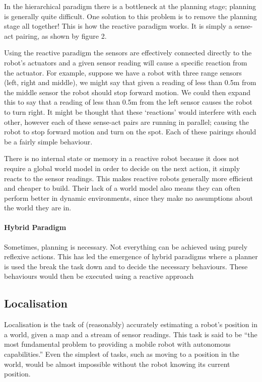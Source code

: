 In the hierarchical paradigm there is a bottleneck at the planning stage; planning is generally quite difficult. One solution to this problem is to remove the planning stage all together! This is how the reactive paradigm works. It is simply a sense-act pairing, as shown by figure 2.

Using the reactive paradigm the sensors are effectively connected directly to the robot’s actuators and a given sensor reading will cause a specific reaction from the actuator. For example, suppose we have a robot with three range sensors (left, right and middle), we might say that given a reading of less than 0.5m from the middle sensor the robot should stop forward motion. We could then expand this to say that a reading of less than 0.5m from the left sensor causes the robot to turn right. It might be thought that these ‘reactions’ would interfere with each other, however each of these sense-act pairs are running in parallel; causing the robot to stop forward motion and turn on the spot. Each of these pairings should be a fairly simple behaviour. 

There is no internal state or memory in a reactive robot because it does not require a global world model in order to decide on the next action, it simply reacts to the sensor readings. This makes reactive robots generally more efficient and cheaper to build. Their lack of a world model also means they can often perform better in dynamic environments, since they make no assumptions about the world they are in. 

\paragraph{Hybrid Paradigm}

Sometimes, planning is necessary. Not everything can be achieved using purely reflexive actions. This has led the emergence of hybrid paradigms where a planner is used the break the task down and to decide the necessary behaviours. These behaviours would then be executed using a reactive approach

\subsection{Localisation}

Localisation is the task of (reasonably) accurately estimating a robot's position in a world, given a map and a stream of sensor readings. This task is said to be “the most fundamental problem to providing a mobile robot with autonomous capabilities.” \parencite{75902} Even the simplest of tasks, such as moving to a position in the world, would be almost impossible without the robot knowing its current position.

